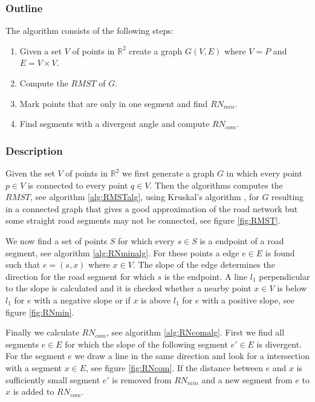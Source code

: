 \documentclass[11pt]{article}
\begin{document}
\subsubsection{Outline}

The algorithm consists of the following steps:
\begin{enumerate}
  \item Given a set $V$ of points in $\mathbb{R}^2$ create a graph $G(V,E)$ where $V=P$ and $E=V\times V$.
  \item Compute the $RMST$ of $G$.
  \item Mark points that are only in one segment and find $RN_{min}$.
  \item Find segments with a divergent angle and compute $RN_{com}$.
  \end{enumerate}
  
\subsubsection{Description}
Given the set $V$ of points in $\mathbb{R}^2$ we first generate a graph $G$ in which every point $p\in V$ is connected to every point $q \in V$. Then the algorithms computes the $RMST$, see algorithm \ref{alg:RMSTalg}, using Kruskal's algorithm \cite{k-osssgtsp-56}, for $G$ resulting in a connected graph that gives a good approximation of the road network but some straight road segments may not be connected, see figure \ref{fig:RMST}.

We now find a set of points $S$ for which every $s \in S$ is a endpoint of a road segment, see algorithm \ref{alg:RNminalg}. For these points a edge $e \in E$ is found such that $e=(s,x)$ where $x \in V$. The slope of the edge determines the direction for the road segment for which $s$ is the endpoint. A line $l_1$ perpendicular to the slope is calculated and it is checked whether a nearby point $x \in V$ is below $l_1$ for $e$ with a negative slope or if $x$ is above $l_1$ for $e$ with a positive slope, see figure \ref{fig:RNmin}.

Finally we calculate $RN_{com}$, see algorithm \ref{alg:RNcomalg}. First we find all segments $e \in E$ for which the slope of the following segment $e' \in E$ is divergent. For the segment $e$ we draw a line in the same direction and look for a intersection with a segment $x \in E$, see figure \ref{fig:RNcom}. If the distance between $e$ and $x$ is sufficiently small segment $e'$ is removed from $RN_{min}$ and a new segment from $e$ to $x$ is added to $RN_{com}$.
\end{document}
